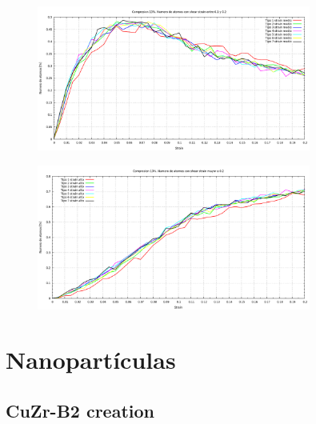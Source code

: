 \documentclass[10pt, oneside]{article} %
\begin{document}
\begin{figure}[H]
\centering
\includegraphics[width=9cm]{Figures/Porosidad/Porosidad_ss_10.png}
\caption{}
\end{figure}

\begin{figure}[H]
\centering
\includegraphics[width=9cm]{Figures/Porosidad/Porosidad_ss_11.png}
\caption{}
\end{figure}

\section{Nanopartículas}

\subsection{CuZr-B2 creation}
\end{document}
